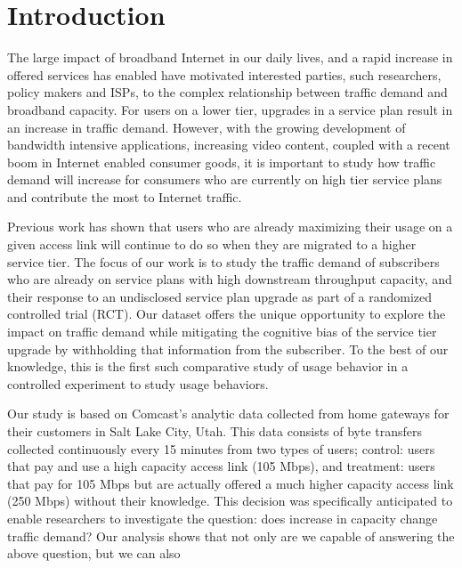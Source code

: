 \section{Introduction}\label{sec:introduction}

The large impact of broadband Internet in our daily lives, and a rapid increase 
in offered services has enabled have motivated interested parties, such 
researchers, policy  makers and ISPs, to the complex relationship between 
traffic demand and broadband capacity. For users on a lower tier, upgrades in a 
service plan result in an increase in traffic demand. However, with the growing 
development of bandwidth intensive applications, increasing video content, 
coupled with a recent boom in Internet enabled consumer goods, it is important 
to study how traffic demand will increase for consumers who are currently on 
high tier service plans and contribute the most to Internet traffic.

Previous work has shown that users who are already maximizing their usage on a 
given access link will continue to do so when they are migrated to a higher 
service tier. The focus of our work is to study the traffic demand 
of subscribers who are already on service plans with high downstream 
throughput capacity, and their response to an undisclosed service plan upgrade 
as part of a randomized controlled trial (RCT). Our dataset offers the 
unique opportunity to explore the impact on traffic demand while mitigating 
the cognitive bias of the service tier upgrade by withholding that information 
from the subscriber. To the best of our knowledge, this is the first such 
comparative study of usage behavior in a controlled experiment to study usage 
behaviors.

Our study is based on Comcast's analytic data collected from home gateways for 
their customers in Salt Lake City, Utah. This data consists of byte transfers
collected continuously every 15 minutes from two types of users; control: users 
that pay and use a high capacity access link (105 Mbps), and treatment: users 
that pay for 105 Mbps but are actually offered a much higher capacity access 
link (250 Mbps) without their knowledge. This decision was specifically 
anticipated to enable researchers to investigate the question: does increase in 
capacity change traffic demand? Our analysis shows that not only are we capable 
of answering the above question, but we can also 


